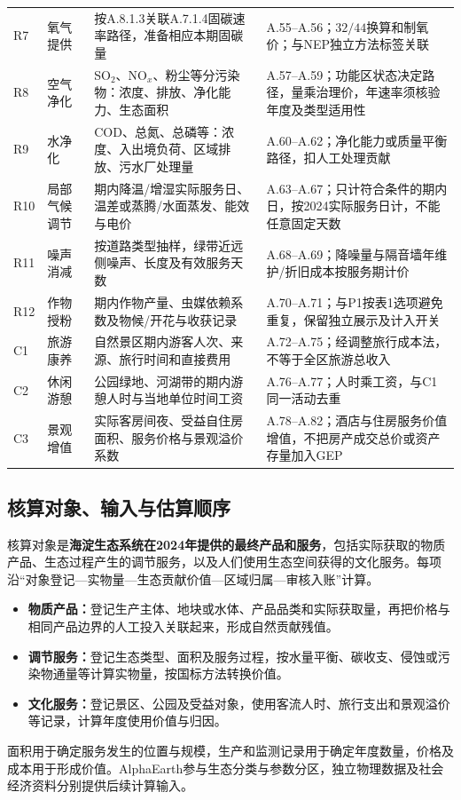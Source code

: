 \documentclass[12pt,a4paper,fontset=fandol]{ctexart}
\begin{document}
{\begin{longtable}{P{0.8cm}P{1.7cm}P{5.6cm}P{4.9cm}}
R7 & 氧气提供 & 按A.8.1.3关联A.7.1.4固碳速率路径，准备相应本期固碳量 & A.55--A.56；$32/44$换算和制氧价；与NEP独立方法标签关联 \\
R8 & 空气净化 & SO$_2$、NO$_x$、粉尘等分污染物：浓度、排放、净化能力、生态面积 & A.57--A.59；功能区状态决定路径，量乘治理价，年速率须核验年度及类型适用性 \\
R9 & 水净化 & COD、总氮、总磷等：浓度、入出境负荷、区域排放、污水厂处理量 & A.60--A.62；净化能力或质量平衡路径，扣人工处理贡献 \\
R10 & 局部气候调节 & 期内降温/增湿实际服务日、温差或蒸腾/水面蒸发、能效与电价 & A.63--A.67；只计符合条件的期内日，按2024实际服务日计，不能任意固定天数 \\
R11 & 噪声消减 & 按道路类型抽样，绿带近远侧噪声、长度及有效服务天数 & A.68--A.69；降噪量与隔音墙年维护/折旧成本按服务期计价 \\
R12 & 作物授粉 & 期内作物产量、虫媒依赖系数及物候/开花与收获记录 & A.70--A.71；与P1按表1选项避免重复，保留独立展示及计入开关 \\
C1 & 旅游康养 & 自然景区期内游客人次、来源、旅行时间和直接费用 & A.72--A.75；经调整旅行成本法，不等于全区旅游总收入 \\
C2 & 休闲游憩 & 公园绿地、河湖带的期内游憩人时与当地单位时间工资 & A.76--A.77；人时乘工资，与C1同一活动去重 \\
C3 & 景观增值 & 实际客房间夜、受益自住房面积、服务价格与景观溢价系数 & A.78--A.82；酒店与住房服务价值增值，不把房产成交总价或资产存量加入GEP \\
\bottomrule
\end{longtable}}

\subsection{核算对象、输入与估算顺序}
核算对象是\textbf{海淀生态系统在2024年提供的最终产品和服务}，包括实际获取的物质产品、生态过程产生的调节服务，以及人们使用生态空间获得的文化服务。每项沿“对象登记—实物量—生态贡献价值—区域归属—审核入账”计算。

\begin{itemize}
\item \textbf{物质产品：}登记生产主体、地块或水体、产品品类和实际获取量，再把价格与相同产品边界的人工投入关联起来，形成自然贡献残值。
\item \textbf{调节服务：}登记生态类型、面积及服务过程，按水量平衡、碳收支、侵蚀或污染物通量等计算实物量，按国标方法转换价值。
\item \textbf{文化服务：}登记景区、公园及受益对象，使用客流人时、旅行支出和景观溢价等记录，计算年度使用价值与归因。
\end{itemize}
面积用于确定服务发生的位置与规模，生产和监测记录用于确定年度数量，价格及成本用于形成价值。AlphaEarth参与生态分类与参数分区，独立物理数据及社会经济资料分别提供后续计算输入。
\end{document}

